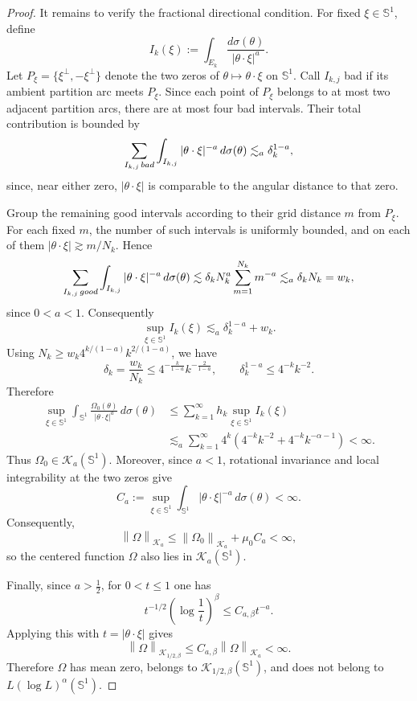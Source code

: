 \documentclass[10pt,a4paper]{amsart}
\newcommand{\Sph}{\mathbb S^1}
\newcommand{\cK}{\mathcal K}
\newcommand{\norm}[1]{\left\lVert #1\right\rVert}
\begin{document}
\begin{proof}
		It remains to verify the fractional directional condition. For fixed
		\(\xi\in\Sph\), define
		\[
		I_k(\xi):=\int_{E_k}\frac{d\sigma(\theta)}{|\theta\cdot\xi|^a}.
		\]
		Let \(P_\xi=\{\xi^\perp,-\xi^\perp\}\) denote the two zeros of
		\(\theta\mapsto\theta\cdot\xi\) on \(\Sph\). Call \(I_{k,j}\) bad if its
		ambient partition arc meets \(P_\xi\). Since each point of \(P_\xi\) belongs to
		at most two adjacent partition arcs, there are at most four bad intervals.
		Their total contribution is bounded by
		\[
		\sum_{I_{k,j}\,{\rm bad}}
		\int_{I_{k,j}}|\theta\cdot\xi|^{-a}\,d\sigma(\theta)
		\lesssim_a \delta_k^{1-a},
		\]
		since, near either zero, \(|\theta\cdot\xi|\) is comparable to the angular
		distance to that zero.
		
		Group the remaining good intervals according to their grid distance \(m\) from
		\(P_\xi\). For each fixed \(m\), the number of such intervals is uniformly
		bounded, and on each of them
		\(|\theta\cdot\xi|\gtrsim m/N_k\). Hence
		\[
		\sum_{I_{k,j}\,{\rm good}}
		\int_{I_{k,j}}|\theta\cdot\xi|^{-a}\,d\sigma(\theta)
		\lesssim
		\delta_k N_k^a
		\sum_{m=1}^{N_k}m^{-a}
		\lesssim_a \delta_kN_k=w_k,
		\]
		since \(0<a<1\). Consequently
		\[
		\sup_{\xi\in\Sph} I_k(\xi)
		\lesssim_a \delta_k^{1-a}+w_k.
		\]
		Using \(N_k\ge w_k4^{k/(1-a)}k^{2/(1-a)}\), we have
		\[
		\delta_k=\frac{w_k}{N_k}
		\le 4^{-\frac{k}{1-a}}k^{-\frac{2}{1-a}},
		\qquad
		\delta_k^{1-a}\le 4^{-k}k^{-2}.
		\]
		Therefore
		\[
		\begin{aligned}
			\sup_{\xi\in\Sph}
			\int_{\Sph}\frac{\Omega_0(\theta)}{|\theta\cdot\xi|^a}
			\,d\sigma(\theta)
			&\le
			\sum_{k=1}^\infty h_k\sup_{\xi\in\Sph}I_k(\xi)\\
			&\lesssim_a
			\sum_{k=1}^\infty 4^k(4^{-k}k^{-2}+4^{-k}k^{-\alpha-1})
			<\infty.
		\end{aligned}
		\]
		Thus \(\Omega_0\in\cK_a(\Sph)\).  Moreover, since \(a<1\), rotational invariance
		and local integrability at the two zeros give
		\[
		C_a:=\sup_{\xi\in\Sph}
		\int_{\Sph}|\theta\cdot\xi|^{-a}\,d\sigma(\theta)<\infty.
		\]
		Consequently,
		\[
		\norm{\Omega}_{\cK_a}
		\le \norm{\Omega_0}_{\cK_a}+\mu_0 C_a<\infty,
		\]
		so the centered function \(\Omega\) also lies in \(\cK_a(\Sph)\).
		
		Finally, since \(a>\frac12\), for \(0<t\le1\) one has
		\[
		t^{-1/2}\left(\log\frac1t\right)^\beta\le C_{a,\beta}t^{-a}.
		\]
		Applying this with \(t=|\theta\cdot\xi|\) gives
		\[
		\norm{\Omega}_{\cK_{1/2,\beta}}
		\le C_{a,\beta}\norm{\Omega}_{\cK_a}<\infty.
		\]
		Therefore \(\Omega\) has mean zero, belongs to
		\(\cK_{1/2,\beta}(\Sph)\), and does not belong to
		\(L(\log L)^\alpha(\Sph)\).
	\end{proof}
\end{document}
